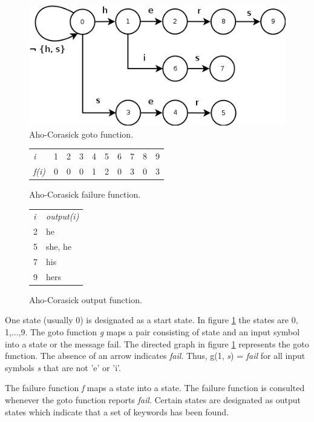\documentclass[thesis=M,english]{FITthesis}[2011/07/15]
\begin{document}
\begin{figure}[h]
\centering
\includegraphics[scale=0.5]{images/goto_function.png}
\caption{Aho-Corasick goto function.}
\label{fig:goto_function}
\end{figure}

\begin{figure}[h]
\centering
\begin{tabular}{l l l l l l l l l l}
\emph{i}       & 1 & 2 & 3 & 4 & 5 & 6 & 7 & 8 & 9 \\
\emph{f(i)}    & 0 & 0 & 0 & 1 & 2 & 0 & 3 & 0 & 3 \\
\end{tabular}
\caption{Aho-Corasick failure function.}
\label{fig:failure_function}
\end{figure}

\begin{figure}[h]
\centering
\begin{tabular}{l l}
\emph{i} & \emph{output(i)} \\
2 & {he} \\
5 & {she, he} \\
7 & {his} \\
9 & {hers} \\
\end{tabular}
\caption{Aho-Corasick output function.}
\label{fig:output_function}
\end{figure}

One state (usually 0) is designated as a start state. In figure \ref{fig:goto_function} the states are 0, 1,...,9. The goto function \emph{g} maps a pair consisting of state and an input symbol into a state or the message fail. The directed graph in figure \ref{fig:goto_function} represents the goto function. The absence of an arrow indicates \emph{fail}. Thus, g(1, \emph{s}) = \emph{fail} for all input symbols \emph{s} that are not 'e' or 'i'.

The failure function \emph{f} maps a state into a state. The failure function is consulted whenever the goto function reports \emph{fail}. Certain states are designated as output states which indicate that a set of keywords has been found.
\end{document}
